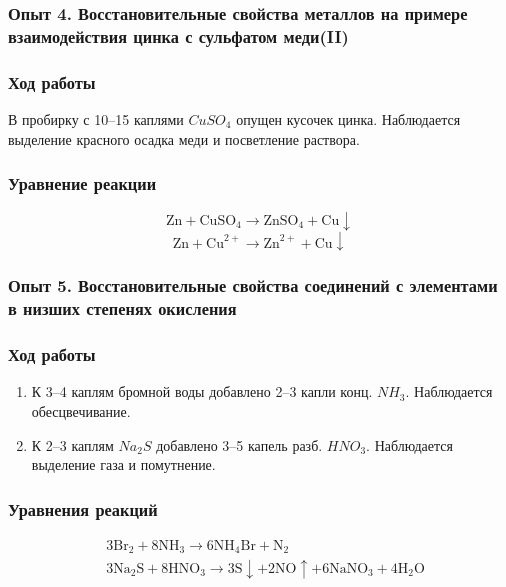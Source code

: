 \documentclass[a4paper,12pt]{article}
\begin{document}
	\subsubsection*{Опыт 4. Восстановительные свойства металлов на примере взаимодействия цинка с сульфатом меди(II)}
	
	\subsubsection*{Ход работы}
	В пробирку с 10–15 каплями \(CuSO_4\) опущен кусочек цинка. Наблюдается выделение красного осадка меди и посветление раствора.
	
	\subsubsection*{Уравнение реакции}
	\[
	\text{Zn} + \text{CuSO}_4 \rightarrow \text{ZnSO}_4 + \text{Cu} \downarrow
	\]
	\[
	\text{Zn} + \text{Cu}^{2+} \rightarrow \text{Zn}^{2+} + \text{Cu} \downarrow
	\]
	
	\subsubsection*{Опыт 5. Восстановительные свойства соединений с элементами в низших степенях окисления}
	
	\subsubsection*{Ход работы}
	\begin{enumerate}
		\item К 3–4 каплям бромной воды добавлено 2–3 капли конц. \(NH_3\). Наблюдается обесцвечивание.
		\item К 2–3 каплям \(Na_2S\) добавлено 3–5 капель разб. \(HNO_3\). Наблюдается выделение газа и помутнение.
	\end{enumerate}
	
	\subsubsection*{Уравнения реакций}
	\begin{align*}
		& 3\text{Br}_2 + 8\text{NH}_3 \rightarrow 6\text{NH}_4\text{Br} + \text{N}_2 \\
		& 3\text{Na}_2\text{S} + 8\text{HNO}_3 \rightarrow 3\text{S} \downarrow + 2\text{NO} \uparrow + 6\text{NaNO}_3 + 4\text{H}_2\text{O}
	\end{align*}
	
\end{document}
